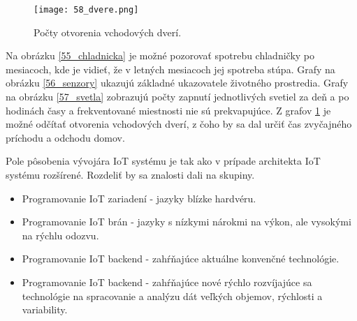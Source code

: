 \begin{figure}[!htbp]
\centering
\texttt{[image: 58\_dvere.png]}
\caption{Počty otvorenia vchodových dverí.}
\label{58_dvere}
\end{figure}
Na obrázku \ref{55_chladnicka} je možné pozorovať spotrebu chladničky po mesiacoch, kde je vidieť, že v letných mesiacoch jej spotreba stúpa. Grafy na obrázku \ref{56_senzory} ukazujú základné ukazovatele životného prostredia. Grafy na obrázku \ref{57_svetla} zobrazujú počty zapnutí jednotlivých svetiel za deň a po hodinách časy a frekventované miestnosti nie sú prekvapujúce. Z grafov \ref{58_dvere} je možné odčítať otvorenia vchodových dverí, z čoho by sa dal určiť čas zvyčajného príchodu a odchodu domov.

Pole pôsobenia vývojára IoT systému je tak ako v prípade architekta IoT systému rozšírené. Rozdeliť by sa znalosti dali na skupiny.
\begin{itemize}
\item Programovanie IoT zariadení - jazyky blízke hardvéru.
\item Programovanie IoT brán - jazyky s nízkymi nárokmi na výkon, ale vysokými na rýchlu odozvu.
\item Programovanie IoT backend - zahŕňajúce aktuálne konvenčné technológie.
\item Programovanie IoT backend - zahŕňajúce nové rýchlo rozvíjajúce sa technológie na spracovanie a analýzu dát veľkých objemov, rýchlosti a variability.
\end{itemize}

